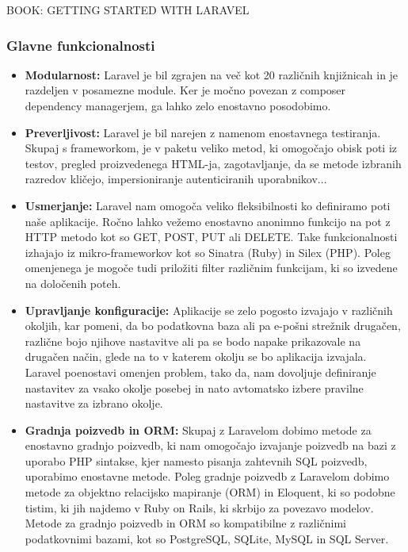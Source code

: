 \documentclass[12pt,a4paper,titlepage,openany]{report}
\begin{document}
BOOK: GETTING STARTED WITH LARAVEL

\subsubsection{Glavne funkcionalnosti}

\begin{itemize}
\item \textbf{Modularnost:} Laravel je bil zgrajen na več kot 20 različnih knjižnicah in je razdeljen v posamezne module. Ker je močno povezan z composer dependency managerjem, ga lahko zelo enostavno posodobimo.

\item \textbf{Preverljivost:}
Laravel je bil narejen z namenom enostavnega testiranja. Skupaj s frameworkom, je v paketu veliko metod, ki omogočajo obisk poti iz testov, pregled proizvedenega HTML-ja, zagotavljanje, da se metode izbranih razredov kličejo, impersioniranje autenticiranih uporabnikov...

\item \textbf{Usmerjanje:}
Laravel nam omogoča veliko fleksibilnosti ko definiramo poti naše aplikacije. Ročno lahko vežemo enostavno anonimno funkcijo na pot z HTTP metodo kot so GET, POST, PUT ali DELETE. Take funkcionalnosti izhajajo iz mikro-frameworkov kot so Sinatra (Ruby) in Silex (PHP). Poleg omenjenega je mogoče tudi priložiti filter različnim funkcijam, ki so izvedene na določenih poteh.

\item \textbf{Upravljanje konfiguracije:}
Aplikacije se zelo pogosto izvajajo v različnih okoljih, kar pomeni, da bo podatkovna baza ali pa e-pošni strežnik drugačen, različne bojo njihove nastavitve ali pa se bodo napake prikazovale na drugačen način, glede na to v katerem okolju se bo aplikacija izvajala. Laravel poenostavi omenjen problem, tako da, nam dovoljuje definiranje nastavitev za vsako okolje posebej in nato avtomatsko izbere pravilne nastavitve za izbrano okolje.

\item \textbf{Gradnja poizvedb in ORM:}
Skupaj z Laravelom dobimo metode za enostavno gradnjo poizvedb, ki nam omogočajo izvajanje poizvedb na bazi z uporabo PHP sintakse, kjer namesto pisanja zahtevnih SQL poizvedb, uporabimo enostavne metode. Poleg gradnje poizvedb z Laravelom dobimo metode za objektno relacijsko mapiranje (ORM) in Eloquent, ki so podobne tistim, ki jih najdemo v Ruby on Rails, ki skrbijo za povezavo modelov. Metode za gradnjo poizvedb in ORM so kompatibilne z različnimi podatkovnimi bazami, kot so PostgreSQL, SQLite, MySQL in SQL Server.


\end{itemize}
\end{document}
